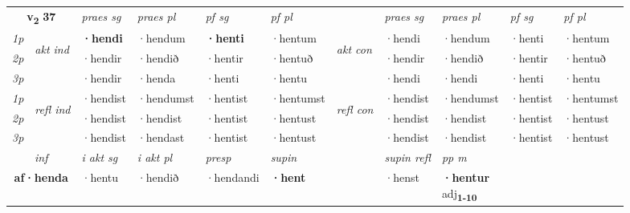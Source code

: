 \noindent
\begin{tabular}{lllllllllll} \toprule
\multicolumn{2}{c}{\textbf{v{\textsubscript{2}}} \Large{\textbf{37}}}  &  \textit{praes sg}  & \textit{praes pl}  &\textit{ pf sg} & \textit{pf pl} &  &  \textit{praes sg}  & \textit{praes pl}  & \textit{pf sg} & \textit{pf pl } \\*
	\cmidrule{3-6} \cmidrule{8-11}
 {\textit{1p}} & \multirow{3}{*}{\begin{turn}{90}\textit{akt ind}\end{turn}} & \textbf{·hendi} & ·hendum & \textbf{·henti} & ·hentum & \multirow{3}{*}{\begin{turn}{90}\textit{akt con}\end{turn}} &·hendi & ·hendum & ·henti & ·hentum\\*
 {\textit{2p}} &  &  ·hendir  & ·hendið & ·hentir & ·hentuð & & ·hendir & ·hendið & ·hentir & ·hentuð \\*
{\textit{3p}} &  & ·hendir & ·henda & ·henti & ·hentu & & ·hendi & ·hendi& ·henti & ·hentu \\*
\cmidrule{3-6} \cmidrule{8-11}
 {\textit{1p}} & \multirow{3}{*}{\begin{turn}{90}\textit{refl ind}\end{turn}}  & ·hendist & ·hendumst & ·hentist & ·hentumst & \multirow{3}{*}{\begin{turn}{90}\textit{refl con}\end{turn}}  &·hendist & ·hendumst & ·hentist & ·hentumst \\*
 {\textit{2p}} &  & ·hendist & ·hendist & ·hentist & ·hentust & &·hendist & ·hendist & ·hentist & ·hentust \\*
 {\textit{3p}}  & & ·hendist & ·hendast & ·hentist & ·hentust & & ·hendist & ·hendist& ·hentist & ·hentust \\*
\cmidrule{3-6} \cmidrule{8-11}

   \multicolumn{2}{c}{\textit{inf}}  & \textit{i akt sg} & \textit{i akt pl}   & \textit{presp} & \textit{supin} && \textit{supin refl} & \textit{pp m} \\*
  \multicolumn{2}{c}{\textbf{af\allowbreak ·henda}} & ·hentu  & ·hendið   & ·hendandi &  \textbf{·hent} && ·henst & \specialcell{\textbf{·hentur} \\ adj\textbf{\textsubscript{1-10}}} \\*
\end{tabular}

